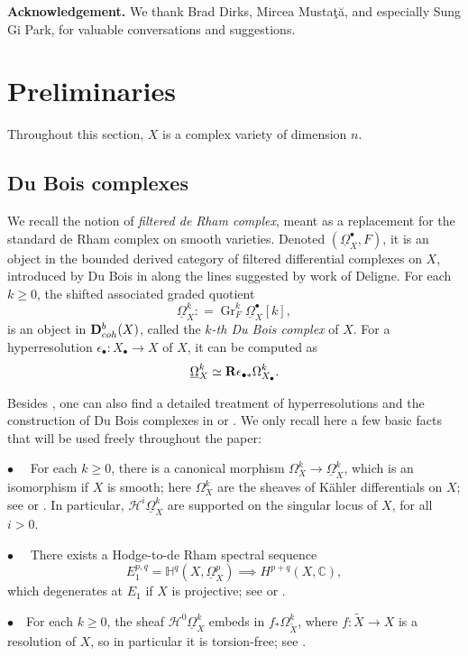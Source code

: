 \documentclass[11pt]{amsart}
\theoremstyle{definition}
\theoremstyle{plain}
\renewcommand{\H}{\mathcal H}
\newcommand{\bR}{{\bf R}}
\newcommand{\CC}{\mathbb C}
\newcommand{\HH}{\mathbb H}
\newcommand{\DD}{\mathbf D}
\newcommand{\DB}{\underline{\Omega}} %
\DeclareMathOperator{\Gr}{Gr}
\newcounter{intro}
\begin{document}
\medskip

\noindent 
\textbf{Acknowledgement.} We thank Brad Dirks, Mircea Musta\c t\u a, and especially Sung Gi Park, for valuable conversations and suggestions.




\section{Preliminaries}

Throughout this section, $X$ is a complex variety of dimension $n$.

\subsection{Du Bois complexes}

We recall the notion of \emph{filtered de Rham complex}, meant as a replacement for the standard de Rham complex on smooth varieties. Denoted 
$(\DB_X^\bullet, F)$, it is an object in the bounded derived category of filtered differential complexes on $X$, introduced by Du Bois in \cite{DB} along the lines suggested by work of Deligne.   For each $k \ge 0$, the shifted associated graded quotient
\[\DB^k_X : = \Gr^k_F \DB^\bullet_X[k],\]
is an object in $\DD^b_{\rm coh}(X)$, called the \emph{$k$-th Du Bois complex} of $X$. For a hyperresolution $\epsilon_{\bullet} \colon X_{\bullet}\to X$ of $X$, it can be computed as
\[\DB_X^k \simeq \bR \epsilon_{\bullet *} \Omega_{X_{\bullet}}^k.\]

Besides \cite{DB}, one can also find a detailed treatment of hyperresolutions and the construction of Du Bois complexes in \cite[Chapter V]{GNPP} or \cite[Chapter 7.3]{PS}. We only recall here a few basic facts that will be used freely throughout the paper:

\noindent
	$\bullet$ ~~For each $k\ge 0$, there is a canonical morphism $\Omega_X^k \to \DB_X^k$, which is an isomorphism if $X$ is smooth; here 
	$\Omega_X^k$ are the sheaves of K\"ahler differentials on $X$; see \cite[Section 4.1]{DB} or \cite[Page 175]{PS}. In particular, $\H^i\DB_X^k$ are supported on the singular locus of $X$, for all $i>0$.
	
\noindent
$\bullet$~~	There exists a Hodge-to-de Rham spectral sequence 
	$$E^{p,q}_1 = \HH^q (X, \DB_X^p) \implies H^{p + q} (X, \CC),$$
	which degenerates at $E_1$ if $X$ is projective; see \cite[Theorem 4.5(iii)]{DB} or \cite[Proposition 7.24]{PS}.

\noindent
$\bullet$~~For each $k\ge 0$, the sheaf $\H^0\DB_X^k$ embeds in $f_* \Omega_{\widetilde{X}}^k$, where $f\colon \widetilde{X} \to X$ is a resolution of $X$, 
so in particular it is torsion-free; see \cite[Remark 3.8]{h-differential}.
\end{document}

